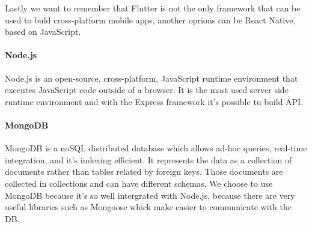 Lastly we want to remember that Flutter is not the only framework that can be used to buld cross-platform mobile apps, another oprions can be React Native, based on JavaScript.


\paragraph{Node.js}
Node.js is an open-source, cross-platform, JavaScript runtime environment that executes JavaScript code outside of a browser. It is the most used server side runtime environment and with the Express framework it's possible tu build API.


\paragraph{MongoDB}
MongoDB is a noSQL distributed database which allows ad-hoc queries, real-time integration, and it's indexing efficient. It represents the data as a collection of documents rather than tables related by foreign keys. Those documents are collected in collections and can have different schemas. We choose to use MongoDB because it's so well intergrated with Node.js, because there are very useful libraries such as Mongoose whick make easier to communicate with the DB.
